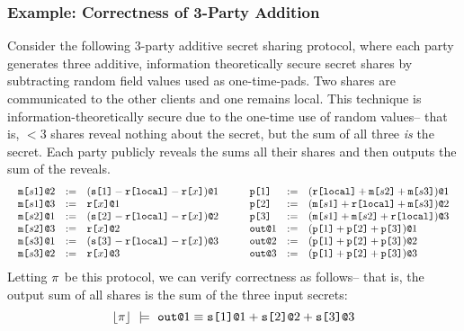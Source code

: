 \subsubsection{Example: Correctness of 3-Party Addition}
Consider the following 3-party additive secret sharing protocol, where
each party generates three additive, information theoretically secure
secret shares by subtracting random field values used as
one-time-pads. Two shares are communicated to the other clients and
one remains local. This technique is information-theoretically secure
\cite{evans2018pragmatic} due to the one-time use of random
values-- that is, $< 3$ shares reveal nothing about the
secret, but the sum of all three \emph{is} the secret. Each party
publicly reveals the sums all their shares and then outputs the sum of the reveals.
{\footnotesize
$$
\begin{array}{c@{\qquad}c}
\begin{array}{lll}
  \elab{\mesg{s1}}{2} &:=& \elab{(\secret{1} \fminus \locflip \fminus \flip{x})}{1} \\ 
  \elab{\mesg{s1}}{3} &:=& \elab{\flip{x}}{1} \\ 
  \elab{\mesg{s2}}{1} &:=& \elab{(\secret{2} \fminus \locflip \fminus \flip{x})}{2} \\ 
  \elab{\mesg{s2}}{3} &:=& \elab{\flip{x}}{2} \\ 
  \elab{\mesg{s3}}{1} &:=& \elab{(\secret{3} \fminus \locflip \fminus \flip{x})}{3} \\ 
  \elab{\mesg{s3}}{2} &:=& \elab{\flip{x}}{3}
\end{array} & 
\begin{array}{lll}
  \rvl{1} &:=& \elab{(\locflip \fplus \mesg{s2} \fplus \mesg{s3})}{1} \\ 
  \rvl{2} &:=& \elab{(\mesg{s1} \fplus \locflip \fplus \mesg{s3})}{2} \\
  \rvl{3} &:=& \elab{(\mesg{s1} \fplus \mesg{s2} \fplus \locflip)}{3} \\
  \out{1} &:=& \elab{(\rvl{1} \fplus \rvl{2} + \rvl{3})}{1}\\
  \out{2} &:=& \elab{(\rvl{1} \fplus \rvl{2} + \rvl{3})}{2}\\
  \out{3} &:=& \elab{(\rvl{1} \fplus \rvl{2} + \rvl{3})}{3}
\end{array}
\end{array}
$$}
Letting $\pi$ be this protocol, we can verify correctness
as follows-- that is, the output sum of all shares is the sum of the
three input secrets:
$$
\toeq{\prog}\ \models\ \out{1} \eop \sx{1}{1} \fplus \sx{2}{2} \fplus \sx{3}{3}
$$

